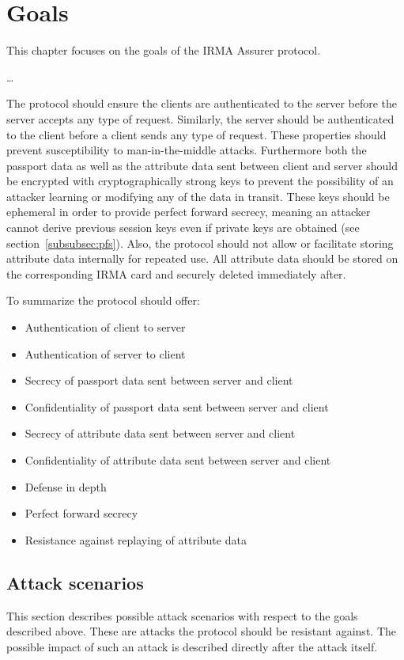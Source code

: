 \section{Goals}
This chapter focuses on the goals of the IRMA Assurer protocol.

\ldots

The protocol should ensure the clients are authenticated to the server before the server accepts any type of request. Similarly, the server should be authenticated to the client before a client sends any type of request. These properties should prevent susceptibility to man-in-the-middle attacks. Furthermore both the passport data as well as the attribute data sent between client and server should be encrypted with cryptographically strong keys to prevent the possibility of an attacker learning or modifying any of the data in transit. These keys should be ephemeral in order to provide perfect forward secrecy, meaning an attacker cannot derive previous session keys even if private keys are obtained (see section~\ref{subsubsec:pfs}). Also, the protocol should not allow or facilitate storing attribute data internally for repeated use. All attribute data should be stored on the corresponding IRMA card and securely deleted immediately after.

To summarize the protocol should offer:
\begin{itemize}
  \item Authentication of client to server
  \item Authentication of server to client
  \item Secrecy of passport data sent between server and client
  \item Confidentiality of passport data sent between server and client
  \item Secrecy of attribute data sent between server and client
  \item Confidentiality of attribute data sent between server and client
  \item Defense in depth
  \item Perfect forward secrecy
  \item Resistance against replaying of attribute data
\end{itemize}

\subsection{Attack scenarios}
This section describes possible attack scenarios with respect to the goals described above. These are attacks the protocol should be resistant against. The possible impact of such an attack is described directly after the attack itself.

